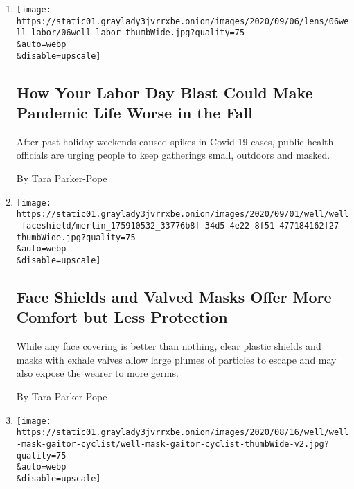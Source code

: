\begin{enumerate}
\def\labelenumi{\arabic{enumi}.}
\item
  \href{/2020/09/06/well/live/labor-day-parties-coronavirus.html}{}

  \texttt{[image: https://static01.graylady3jvrrxbe.onion/images/2020/09/06/lens/06well-labor/06well-labor-thumbWide.jpg?quality=75\\\&auto=webp\\\&disable=upscale]}

  \hypertarget{how-your-labor-day-blast-could-make-pandemic-life-worse-in-the-fall}{%
  \subsection{How Your Labor Day Blast Could Make Pandemic Life Worse in
  the
  Fall}\label{how-your-labor-day-blast-could-make-pandemic-life-worse-in-the-fall}}

  After past holiday weekends caused spikes in Covid-19 cases, public
  health officials are urging people to keep gatherings small, outdoors
  and masked.

  By Tara Parker-Pope
\item
  \href{/2020/09/01/well/live/face-shields-masks-valves-vents.html}{}

  \texttt{[image: https://static01.graylady3jvrrxbe.onion/images/2020/09/01/well/well-faceshield/merlin\_175910532\_33776b8f-34d5-4e22-8f51-477184162f27-thumbWide.jpg?quality=75\\\&auto=webp\\\&disable=upscale]}

  \hypertarget{face-shields-and-valved-masks-offer-more-comfort-but-less-protection}{%
  \subsection{Face Shields and Valved Masks Offer More Comfort but Less
  Protection}\label{face-shields-and-valved-masks-offer-more-comfort-but-less-protection}}

  While any face covering is better than nothing, clear plastic shields
  and masks with exhale valves allow large plumes of particles to escape
  and may also expose the wearer to more germs.

  By Tara Parker-Pope
\item
  \href{/2020/08/17/well/live/coronavirus-gaiters-masks.html}{}

  \texttt{[image: https://static01.graylady3jvrrxbe.onion/images/2020/08/16/well/well-mask-gaitor-cyclist/well-mask-gaitor-cyclist-thumbWide-v2.jpg?quality=75\\\&auto=webp\\\&disable=upscale]}


\end{enumerate}
